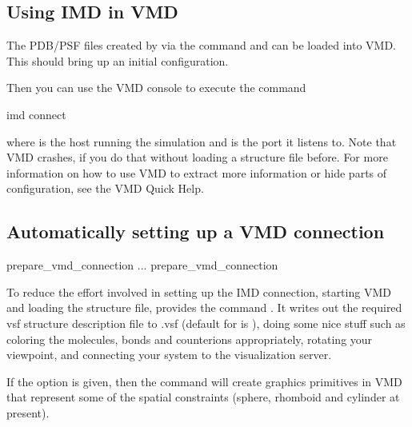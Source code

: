 \subsection{Using IMD in VMD}

The PDB/PSF files created by \es via the command  and
 can be loaded into VMD. This should bring up an initial
configuration.

Then you can use the VMD console to execute the command
\begin{tclcode}
  imd connect  
\end{tclcode}
where  is the host running the simulation and  is
the port it listens to. Note that VMD crashes, if you do that without
loading a structure file before.  For more information on how to use
VMD to extract more information or hide parts of configuration, see
the VMD Quick Help.

\subsection{Automatically setting up a VMD connection}

\begin{essyntax}
 prepare_vmd_connection 
   
...
 prepare_vmd_connection 
\end{essyntax}

To reduce the effort involved in setting up the IMD connection,
starting VMD and loading the structure file, \es provides the command
.  It writes out the required
vsf structure description file to .vsf (default
for  is ), doing some nice stuff such as
coloring the molecules, bonds and counterions appropriately, rotating
your viewpoint, and connecting your system to the visualization
server.

If the option  is given, then the command will create
graphics primitives in VMD that represent some of the spatial
constraints (sphere, rhomboid and cylinder at present).


